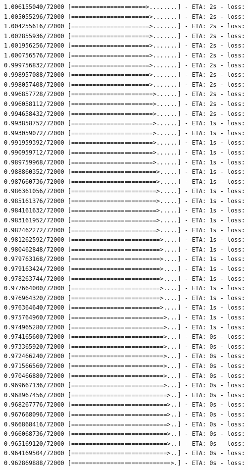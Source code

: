 \documentclass[12pt,fleqn]{article}\usepackage{../../common}
\begin{document}
\begin{verbatim}
1.006155040/72000 [=====================>........] - ETA: 2s - loss: 1.005055296/72000 [======================>.......] - ETA: 2s - loss: 1.004255616/72000 [======================>.......] - ETA: 2s - loss: 1.002855936/72000 [======================>.......] - ETA: 2s - loss: 1.001956256/72000 [======================>.......] - ETA: 2s - loss: 1.000756576/72000 [======================>.......] - ETA: 2s - loss: 0.999756832/72000 [======================>.......] - ETA: 2s - loss: 0.998957088/72000 [======================>.......] - ETA: 2s - loss: 0.998057408/72000 [======================>.......] - ETA: 2s - loss: 0.996857728/72000 [=======================>......] - ETA: 2s - loss: 0.996058112/72000 [=======================>......] - ETA: 2s - loss: 0.994658432/72000 [=======================>......] - ETA: 2s - loss: 0.993858752/72000 [=======================>......] - ETA: 1s - loss: 0.993059072/72000 [=======================>......] - ETA: 1s - loss: 0.991959392/72000 [=======================>......] - ETA: 1s - loss: 0.990959712/72000 [=======================>......] - ETA: 1s - loss: 0.989759968/72000 [=======================>......] - ETA: 1s - loss: 0.988860352/72000 [========================>.....] - ETA: 1s - loss: 0.987660736/72000 [========================>.....] - ETA: 1s - loss: 0.986361056/72000 [========================>.....] - ETA: 1s - loss: 0.985161376/72000 [========================>.....] - ETA: 1s - loss: 0.984161632/72000 [========================>.....] - ETA: 1s - loss: 0.983161952/72000 [========================>.....] - ETA: 1s - loss: 0.982462272/72000 [========================>.....] - ETA: 1s - loss: 0.981262592/72000 [=========================>....] - ETA: 1s - loss: 0.980462848/72000 [=========================>....] - ETA: 1s - loss: 0.979763168/72000 [=========================>....] - ETA: 1s - loss: 0.979163424/72000 [=========================>....] - ETA: 1s - loss: 0.978263744/72000 [=========================>....] - ETA: 1s - loss: 0.977664000/72000 [=========================>....] - ETA: 1s - loss: 0.976964320/72000 [=========================>....] - ETA: 1s - loss: 0.976364640/72000 [=========================>....] - ETA: 1s - loss: 0.975764960/72000 [==========================>...] - ETA: 1s - loss: 0.974965280/72000 [==========================>...] - ETA: 1s - loss: 0.974165600/72000 [==========================>...] - ETA: 0s - loss: 0.973365920/72000 [==========================>...] - ETA: 0s - loss: 0.972466240/72000 [==========================>...] - ETA: 0s - loss: 0.971566560/72000 [==========================>...] - ETA: 0s - loss: 0.970466880/72000 [==========================>...] - ETA: 0s - loss: 0.969667136/72000 [==========================>...] - ETA: 0s - loss: 0.968967456/72000 [===========================>..] - ETA: 0s - loss: 0.968267776/72000 [===========================>..] - ETA: 0s - loss: 0.967668096/72000 [===========================>..] - ETA: 0s - loss: 0.966868416/72000 [===========================>..] - ETA: 0s - loss: 0.966068736/72000 [===========================>..] - ETA: 0s - loss: 0.965169120/72000 [===========================>..] - ETA: 0s - loss: 0.964169504/72000 [===========================>..] - ETA: 0s - loss: 0.962869888/72000 [============================>.] - ETA: 0s - loss: 
\end{verbatim}
\end{document}
